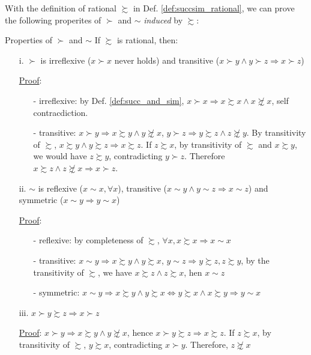 With the definition of rational $\succsim$ in Def. \ref{def:succsim_rational}, we can prove the following properites of $\succ$ and $\sim$ \textit{induced} by $\succsim$:
\begin{theorem}{Properties of $\succ$ and $\sim$}{}
    If $\succsim$ is rational, then:
    \begin{enumerate}
        \item[i.] $\succ$ is irreflexive ($x\succ x$ never holds) and transitive ($x\succ y \land y\succ z\Rightarrow x\succ z$)
        
        \underline{Proof}:
        \begin{enumerate}
            \item[-] irreflexive: by Def. \ref{def:succ_and_sim}, $x\succ x\Rightarrow x\succsim x \land x\not\succsim x$, self contracdiction.
            \item[-] transitive: $x\succ y \Rightarrow x\succsim y \land y\not\succsim x$, $y\succ z \Rightarrow y\succsim z \land z\not\succsim y$. By transitivity of $\succsim$, $x\succsim y\land y\succsim z\Rightarrow x\succsim z$. If $z\succsim x$, by transitivity of $\succsim$ and $x\succsim y$, we would have $z\succsim y$, contradicting $y\succ z$. Therefore $x\succsim z \land z\not\succsim x\Rightarrow x\succ z$. 
        \end{enumerate}
        \item[ii.] $\sim$ is reflexive ($x\sim x, \forall x$), transitive ($x\sim y\land y\sim z\Rightarrow x\sim z$) and symmetric ($x\sim y\Rightarrow y\sim x$)
        
        \underline{Proof}:
        \begin{enumerate}
            \item[-] reflexive: by completeness of $\succsim$, $\forall x, x\succsim x\Rightarrow x\sim x$
            \item[-] transitive: $x\sim y\Rightarrow x\succsim y \land y\succsim x$, $y\sim z\Rightarrow y\succsim z, z\succsim y$, by the transitivity of $\succsim$, we have $x\succsim z \land z\succsim x$, hen $x\sim z$
            \item[-] symmetric: $x\sim y \Rightarrow x\succsim y \land y\succsim x\Leftrightarrow y\succsim x \land x\succsim y\Rightarrow y\sim x$
        \end{enumerate}
        \item[iii.] $x\succ y\succsim z\Rightarrow x\succ z$ 
        
        \underline{Proof}: $x\succ y\Rightarrow x\succsim y\land y\not\succsim x$, hence $x\succ y\succsim z\Rightarrow x\succsim z$. If $z\succsim x$, by transitivity of $\succsim$, $y\succsim x$, contradicting $x\succ y$. Therefore, $z\not\succsim x$
    \end{enumerate}
\end{theorem}

